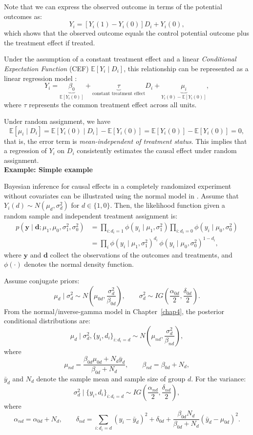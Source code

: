 Note that we can express the observed outcome in terms of the potential outcomes as:
\[
Y_i = [Y_i(1) - Y_i(0)] D_i + Y_i(0),
\]
which shows that the observed outcome equals the control potential outcome plus the treatment effect if treated.

Under the assumption of a constant treatment effect and a linear \textit{Conditional Expectation Function} (CEF) $\mathbb{E}[Y_i\mid D_i]$, this relationship can be represented as a linear regression model \cite{angrist2009mostly}:
\[
Y_i = \underbrace{\beta_0}_{\mathbb{E}[Y_i(0)]} 
+ \underbrace{\tau}_{\text{constant treatment effect}} D_i 
+ \underbrace{\mu_i}_{Y_i(0) - \mathbb{E}[Y_i(0)]},
\]
where $\tau$ represents the common treatment effect across all units.

Under random assignment, we have
\begin{equation}\label{eq:12_1}
	\mathbb{E}[\mu_i \mid D_i] = \mathbb{E}[Y_i(0) \mid D_i] - \mathbb{E}[Y_i(0)] = \mathbb{E}[Y_i(0)] - \mathbb{E}[Y_i(0)] = 0,
\end{equation}
that is, the error term is \textit{mean-independent of treatment status}. This implies that a regression of $Y_i$ on $D_i$ consistently estimates the causal effect under random assignment.\\

\textbf{Example: Simple example}

Bayesian inference for causal effects in a completely randomized experiment without covariates can be illustrated using the normal model in \cite{rubin1990neyman}. Assume that $Y_i(d) \sim N(\mu_d, \sigma_d^2)$ for $d \in \{1,0\}$. Then, the likelihood function given a random sample and independent treatment assignment is:
\begin{align*}
	p(\mathbf{y} \mid \mathbf{d}; \mu_1,\mu_0,\sigma^2_1,\sigma^2_0)
	&= \prod_{i:d_i=1}\phi(y_i \mid \mu_1,\sigma_1^2) \prod_{i:d_i=0}\phi(y_i \mid \mu_0,\sigma_0^2) \\
	&= \prod_{i}\phi(y_i \mid \mu_1,\sigma_1^2)^{d_i} \, \phi(y_i \mid \mu_0,\sigma_0^2)^{1-d_i},
\end{align*}
where $\mathbf{y}$ and $\mathbf{d}$ collect the observations of the outcomes and treatments, and $\phi(\cdot)$ denotes the normal density function.

Assume conjugate priors: 
\[
\mu_d \mid \sigma^2_d \sim N\left(\mu_{0d}, \frac{\sigma^2_d}{\beta_{0d}}\right), 
\qquad 
\sigma^2_d \sim IG\left(\frac{\alpha_{0d}}{2}, \frac{\delta_{0d}}{2}\right).
\]
From the normal/inverse-gamma model in Chapter~\ref{chap4}, the posterior conditional distributions are:
\[
\mu_d \mid \sigma^2_d, \{y_i,d_i\}_{i:d_i=d} \sim N \left(\mu_{nd}, \frac{\sigma^2_d}{\beta_{nd}}\right), 
\]
where
\[
\mu_{nd} = \frac{\beta_{0d}\mu_{0d} + N_d \bar{y}_d}{\beta_{0d} + N_d}, 
\qquad 
\beta_{nd} = \beta_{0d} + N_d,
\]
$\bar{y}_d$ and $N_d$ denote the sample mean and sample size of group $d$. For the variance:
\[
\sigma^2_d \mid \{y_i,d_i\}_{i:d_i=d} \sim IG\left(\frac{\alpha_{nd}}{2}, \frac{\delta_{nd}}{2}\right),
\]
where
\[
\alpha_{nd} = \alpha_{0d} + N_d,
\qquad 
\delta_{nd} = \sum_{i:d_i=d} (y_i-\bar{y}_d)^2 + \delta_{0d} + \frac{\beta_{0d}N_d}{\beta_{0d}+N_d}(\bar{y}_d-\mu_{0d})^2.
\]

